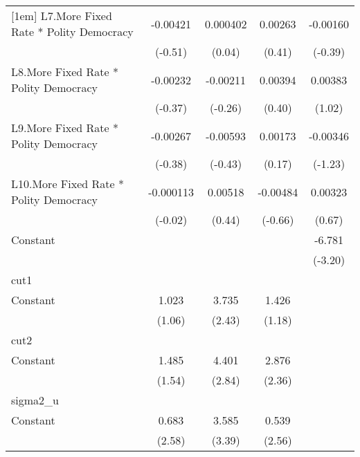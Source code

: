 {\begin{tabular}{l*{4}{c}}
[1em]
L7.More Fixed Rate * Polity Democracy& -0.00421         & 0.000402         &  0.00263         & -0.00160         \\
                &  (-0.51)         &   (0.04)         &   (0.41)         &  (-0.39)         \\
[1em]
L8.More Fixed Rate * Polity Democracy& -0.00232         & -0.00211         &  0.00394         &  0.00383         \\
                &  (-0.37)         &  (-0.26)         &   (0.40)         &   (1.02)         \\
[1em]
L9.More Fixed Rate * Polity Democracy& -0.00267         & -0.00593         &  0.00173         & -0.00346         \\
                &  (-0.38)         &  (-0.43)         &   (0.17)         &  (-1.23)         \\
[1em]
L10.More Fixed Rate * Polity Democracy&-0.000113         &  0.00518         & -0.00484         &  0.00323         \\
                &  (-0.02)         &   (0.44)         &  (-0.66)         &   (0.67)         \\
[1em]
Constant        &                  &                  &                  &   -6.781\sym{**} \\
                &                  &                  &                  &  (-3.20)         \\
\hline
cut1            &                  &                  &                  &                  \\
Constant        &    1.023         &    3.735\sym{*}  &    1.426         &                  \\
                &   (1.06)         &   (2.43)         &   (1.18)         &                  \\
\hline
cut2            &                  &                  &                  &                  \\
Constant        &    1.485         &    4.401\sym{**} &    2.876\sym{*}  &                  \\
                &   (1.54)         &   (2.84)         &   (2.36)         &                  \\
\hline
sigma2\_u        &                  &                  &                  &                  \\
Constant        &    0.683\sym{**} &    3.585\sym{***}&    0.539\sym{*}  &                  \\
                &   (2.58)         &   (3.39)         &   (2.56)         &                  \\

\end{tabular}}
